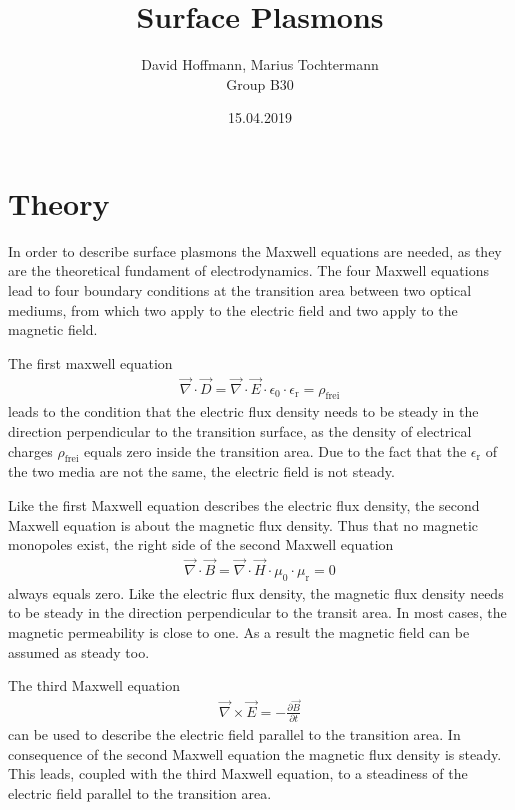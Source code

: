 \documentclass[twoside,english,headsepline=on,DIV=12]{scrartcl}
\numberwithin{equation}{section}
\begin{document}
\titlehead{{\Large Universität Stuttgart
\hfill SS 19\\}
Physikalisches Praktikum II}
\subject{Laboratory Report}
\title{Surface Plasmons}
\author{David Hoffmann, Marius Tochtermann \\
Group B30}
\publishers{}
\date{15.04.2019}
\maketitle
\begin{abstract}
\end{abstract}
\tableofcontents
\newpage
\section{Theory}
In order to describe surface plasmons the Maxwell equations are needed, as they are the theoretical fundament of electrodynamics. The four Maxwell equations lead to four boundary conditions at the transition area between two optical mediums, from which two apply to the electric field and two apply to the magnetic field. 

The first maxwell equation
\begin{align}
\vec{\nabla} \cdot \vec{D} = \vec{\nabla} \cdot \vec{E}\cdot \epsilon_0 \cdot \epsilon_\text{r} =  \rho_\text{frei} \label{eq:Maxwell1}
\end{align}
leads to the condition that the electric flux density needs to be steady in the direction perpendicular to the transition surface, as the density of electrical charges $\rho_\text{frei}$ equals zero inside the transition area. Due to the fact that the $\epsilon_\text{r}$ of the two media are not the same, the electric field is not steady.

Like the first Maxwell equation describes the electric flux density, the second Maxwell equation is about the magnetic flux density. Thus that no magnetic monopoles exist, the right side of the second Maxwell equation
\begin{align}
\vec{\nabla} \cdot \vec{B} = \vec{\nabla} \cdot \vec{H}\cdot \mu_0 \cdot \mu_\text{r} =  0 \label{eq:Maxwell2}
\end{align}
always equals zero. Like the electric flux density, the magnetic flux density needs to be steady in the direction perpendicular to the transit area. In most cases, the magnetic permeability is close to one. As a result the magnetic field can be assumed as steady too.

The third Maxwell equation 
\begin{align}
\vec{\nabla} \times \vec{E} = -\frac{\partial \vec{B}}{\partial t} \label{eq:Maxwell3}
\end{align}
can be used to describe the electric field parallel to the transition area. In consequence of the second Maxwell equation the magnetic flux density is steady. This leads, coupled with the third Maxwell equation, to a steadiness of the electric field parallel to the transition area.
\end{document}
